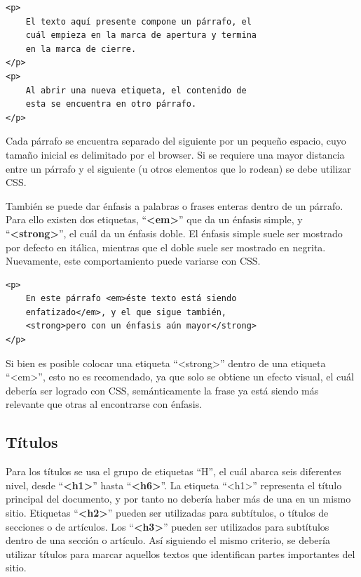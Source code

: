 \begin{lstlisting}[language=XHTML]
<p>
    El texto aquí presente compone un párrafo, el
    cuál empieza en la marca de apertura y termina
    en la marca de cierre.
</p>
<p>
    Al abrir una nueva etiqueta, el contenido de
    esta se encuentra en otro párrafo.
</p>
\end{lstlisting}

Cada párrafo se encuentra separado del siguiente por un pequeño espacio, cuyo
tamaño inicial es delimitado por el browser. Si se requiere una mayor distancia
entre un párrafo y el siguiente (u otros elementos que lo rodean) se debe utilizar
CSS.

También se puede dar énfasis a palabras o frases enteras dentro de un párrafo.
Para ello existen dos etiquetas, ``\textbf{<em>}'' que da un énfasis simple, y
``\textbf{<strong>}'', el cuál da un énfasis doble. El énfasis simple suele ser
mostrado por defecto en itálica, mientras que el doble suele ser mostrado en
negrita. Nuevamente, este comportamiento puede variarse con CSS.

\begin{lstlisting}[language=XHTML]
<p>
    En este párrafo <em>éste texto está siendo
    enfatizado</em>, y el que sigue también,
    <strong>pero con un énfasis aún mayor</strong>
</p>
\end{lstlisting}

Si bien es posible colocar una etiqueta ``<strong>'' dentro de una etiqueta
``<em>'', esto no es recomendado, ya que solo se obtiene un efecto visual, el
cuál debería ser logrado con CSS, semánticamente la frase ya está siendo más
relevante que otras al encontrarse con énfasis.

\subsection*{Títulos}

Para los títulos se usa el grupo de etiquetas ``H'', el cuál abarca seis diferentes
nivel, desde ``\textbf{<h1>}'' hasta ``\textbf{<h6>}''. La etiqueta ``<h1>''
representa el título principal del documento, y por tanto no debería haber más
de una en un mismo sitio. Etiquetas ``\textbf{<h2>}'' pueden ser utilizadas para
subtítulos, o títulos de secciones o de artículos. Los ``\textbf{<h3>}'' pueden
ser utilizados para subtítulos dentro de una sección o artículo. Así siguiendo el
mismo criterio, se debería utilizar títulos para marcar aquellos textos que identifican
partes importantes del sitio.

